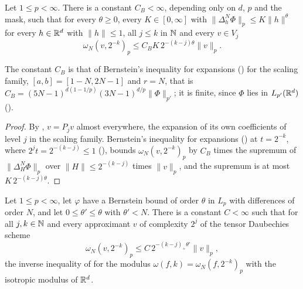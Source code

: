 \begin{theorem}
\label{thm:daub-rd-inverse-estimate}
\leanok
{}
Let $1 \leq p < \infty$. There is a constant $C_B < \infty$, depending only on $d$, $p$ and the
mask, such that for every $\theta \geq 0$, every $K \in [0, \infty]$ with
$\|\Delta_h^N \Phi\|_p \leq K \|h\|^\theta$ for every $h \in \mathbb{R}^d$ with $\|h\| \leq 1$, all
$j \leq k$ in $\mathbb{N}$ and every $v \in V_j$
\[
  \omega_N(v, 2^{-k})_p \leq C_B K \, 2^{-(k-j)\theta} \|v\|_p .
\]
\end{theorem}

The constant $C_B$ is that of Bernstein's inequality for expansions
() for the scaling family, $[a, b] = [1 - N, 2N - 1]$ and
$r = N$, that is $C_B = (5N - 1)^{d(1 - 1/p)} (3N - 1)^{d/p} \|\Phi\|_{p'}$; it is finite, since
$\Phi$ lies in $L_{p'}(\mathbb{R}^d)$ ().

\begin{proof}
\leanok
{}
By , $v = P_j v$ almost everywhere, the expansion of its own
coefficients of level $j$ in the scaling family. Bernstein's inequality for expansions
() at $t = 2^{-k}$, where $2^j t = 2^{-(k-j)} \leq 1$
(), bounds $\omega_N(v, 2^{-k})_p$ by $C_B$ times the supremum of
$\|\Delta_H^N \Phi\|_p$ over $\|H\| \leq 2^{-(k-j)}$ times $\|v\|_p$, and the supremum is at most
$K \, 2^{-(k-j)\theta}$.
\end{proof}

\begin{corollary}
\label{cor:daub-rd-inverse}
\leanok
{}
Let $1 \leq p < \infty$, let $\varphi$ have a Bernstein bound of order $\theta$ in $L_p$ with
differences of order $N$, and let $0 \leq \theta' \leq \theta$ with $\theta' < N$. There is a
constant $C < \infty$ such that for all $j, k \in \mathbb{N}$ and every approximant $v$ of complexity
$2^j$ of the tensor Daubechies scheme
\[
  \omega_N(v, 2^{-k})_p \leq C \, 2^{-(k-j)_+ \theta'} \|v\|_p ,
\]
the inverse inequality of  for the modulus
$\omega(f, k) = \omega_N(f, 2^{-k})_p$ with the isotropic modulus of $\mathbb{R}^d$.
\end{corollary}


